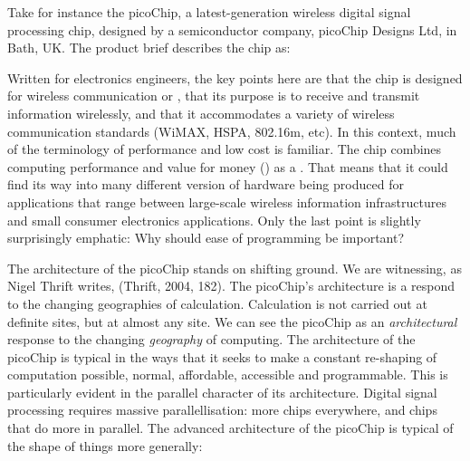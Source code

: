 Take for instance the picoChip, a latest{}-generation wireless digital
signal processing chip, designed by a  semiconductor company,
picoChip Designs Ltd, in Bath, UK. The product brief describes the chip
as:


Written for electronics engineers, the key points here are that the chip
is designed for wireless communication or , that its
purpose is to receive and transmit information wirelessly, and that it
accommodates a variety of wireless communication standards (WiMAX,
HSPA, 802.16m, etc). In this context, much of the terminology of
performance and low cost is familiar. The chip combines computing
performance and value for money () as a . That
means that it could find its way into many different version of
hardware being produced for applications that range between
large{}-scale wireless information infrastructures and small consumer
electronics applications. Only the last point is slightly surprisingly
emphatic:  Why should ease of
programming be important?


The architecture of the picoChip stands on shifting ground. We are
witnessing, as Nigel Thrift writes,  (Thrift, 2004, 182). The
picoChip's architecture is a respond to the changing
geographies of calculation. Calculation is not carried out at definite
sites, but at almost any site. We can see the picoChip as an {\em 
architectural} response to the changing {\em geography} of
computing. The architecture of the picoChip is typical in the ways that
it seeks to make a constant re{}-shaping of computation possible,
normal, affordable, accessible and programmable. This is particularly
evident in the parallel character of its architecture. Digital signal
processing requires massive parallellisation: more chips everywhere,
and chips that do more in parallel. The advanced architecture of the
picoChip is typical of the shape of things more generally: 

